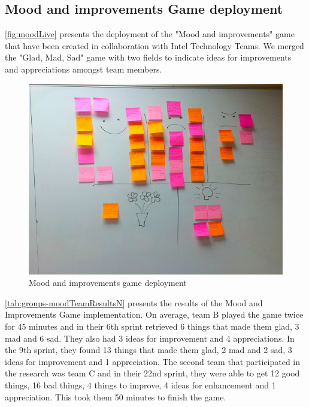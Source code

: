 \subsection{Mood and improvements Game deployment}
\autoref{fig:moodLive} presents the deployment of the "Mood and improvements" game that have been created in collaboration with Intel Technology Teams. We merged the "Glad, Mad, Sad" game with two fields to indicate ideas for improvements and appreciations amongst team members. 

\begin{figure}[!htbp]
\caption{Mood and improvements game deployment}
\label{fig:moodLive}
\centering
\includegraphics[width=1\textwidth]{live/moodLive}
\end{figure}

\autoref{tab:groups-moodTeamResultsN} presents the results of the Mood and Improvements Game implementation. On average, team B played the game twice for 45 minutes and in their 6th sprint retrieved 6 things that made them glad, 3 mad and 6 sad. They also had 3 ideas for improvement and 4 appreciations. In the 9th sprint, they found 13 things that made them glad, 2 mad and 2 sad, 3 ideas for improvement and 1 appreciation. The second team that participated in the research was team C and in their 22nd sprint, they were able to get 12 good things, 16 bad things, 4 things to improve, 4 ideas for enhancement and 1 appreciation. This took them 50 minutes to finish the game.

